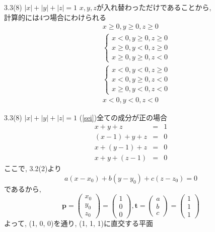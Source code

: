 \documentclass{beamer}
\begin{document}
\begin{frame}{3.3(8) $|x| + |y| + |z|  = 1$}
  $x, y, z$が入れ替わっただけであることから, \\
  計算的には4つ場合にわけられる
  \begin{eqnarray}
    \label{sei}
    && x \geq 0, y \geq 0, z \geq 0 \\
    \label{hu1}
    && \left\{
    \begin{array}{c}
    x < 0, y \geq 0, z \geq 0 \\
    x \geq 0, y < 0, z \geq 0 \\
    x \geq 0, y \geq 0, z < 0 
    \end{array} \right. \\
    \label{hu2}
    && \left\{
    \begin{array}{c}
    x < 0, y < 0, z \geq 0 \\
    x < 0, y \geq 0, z < 0 \\
    x \geq 0, y < 0, z < 0 
    \end{array} \right. \\
    \label{hu}
    && x < 0, y < 0, z < 0 
  \end{eqnarray}
\end{frame}




\begin{frame}{3.3(8) $|x| + |y| + |z|  = 1$ \hspace{5mm} (\ref{sei})全ての成分が正の場合}
  \begin{eqnarray*}
    x + y + z &=& 1\\
    (x-1) + y + z &=& 0\\
    x + (y-1) + z &=& 0\\
    x + y + (z-1) &=& 0
  \end{eqnarray*}
  ここで, 3.2(2)より
  \begin{equation*}
    a(x-x_0) + b(y-y_0) + c(z-z_0) = 0
  \end{equation*}
  であるから,
  \begin{equation*}
    \bm{p} = 
    \begin{pmatrix}
      x_0\\
      y_0\\
      z_0
    \end{pmatrix} =
    \begin{pmatrix}
      1\\
      0\\
      0
    \end{pmatrix} , 
    \bm{t} = 
    \begin{pmatrix}
      a\\
      b\\
      c
    \end{pmatrix} =
    \begin{pmatrix}
      1\\
      1\\
      1
    \end{pmatrix}
  \end{equation*}
  よって, (1, 0, 0)を通り, (1, 1, 1)に直交する平面
\end{frame}
\end{document}
